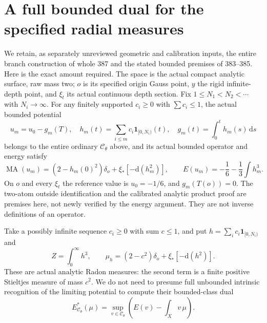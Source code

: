 \documentclass[11pt]{article}
\newcommand{\MA}{\operatorname{MA}}
\begin{document}
\section{A full bounded dual for the specified radial measures}
We retain, as separately unreviewed geometric and calibration inputs,
the entire branch construction of whole 387 and the stated bounded
premises of 383--385. Here is the exact amount required. The space is
the actual compact analytic surface, raw mass two; $o$ is its specified
origin Gauss point, $y$ the rigid infinite-depth point, and
$\xi_t$ its actual continuous depth section. Fix $1\leq N_1<N_2<\cdots$
with $N_i\to\infty$. For any finitely supported $c_i\geq0$ with
$\sum c_i\leq1$, the actual bounded potential
\[
 u_m=u_0-g_m(T),\quad
 h_m(t)=\sum_{i\leq m}c_i\mathbf1_{[0,N_i)}(t),\quad
 g_m(t)=\int_0^t h_m(s)\,\mathrm ds
\]
belongs to the entire ordinary $\mathcal C_\theta$ above, and its
actual bounded operator and energy satisfy
\begin{equation}\label{eq:calibration}
 \MA(u_m)=(2-h_m(0)^2)\delta_o+\xi_*[-\mathrm d(h_m^2)],
 \qquad E(u_m)=-\frac16-\frac13\int h_m^3.
\end{equation}
On $o$ and every $\xi_t$ the reference value is $u_0=-1/6$,
and $g_m(T(o))=0$. The two-atom outside identification and the
calibrated analytic product proof are premises here, not newly verified
by the energy argument. They are not inverse definitions of an operator.

Take a possibly infinite sequence $c_i\geq0$ with sum $c\leq1$,
and put $h=\sum_i c_i\mathbf1_{[0,N_i)}$ and
\[
 Z=\int_0^\infty h^3,\qquad
 \mu_h=(2-c^2)\delta_o+\xi_*[-\mathrm d(h^2)].
\]
These are actual analytic Radon measures: the second term is a finite
positive Stieltjes measure of mass $c^2$. We do not need to presume
full unbounded intrinsic recognition of the limiting potential to
compute their bounded-class dual
\[
 E^*_{\mathcal C_\theta}(\mu)
          =\sup_{v\in\mathcal C_\theta}\left(E(v)-\int_Xv\,\mu\right).
\]
\end{document}
